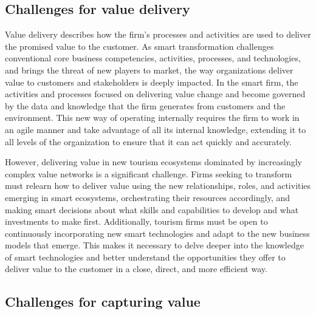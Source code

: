 \documentclass[
  letterpaper,
  DIV=11,
  numbers=noendperiod]{scrreprt}
\begin{document}
\hypertarget{challenges-for-value-delivery}{%
\subsection{Challenges for value
delivery}\label{challenges-for-value-delivery}}

Value delivery describes how the firm's processes and activities are
used to deliver the promised value to the customer. As smart
transformation challenges conventional core business competencies,
activities, processes, and technologies, and brings the threat of new
players to market, the way organizations deliver value to customers and
stakeholders is deeply impacted. In the smart firm, the activities and
processes focused on delivering value change and become governed by the
data and knowledge that the firm generates from customers and the
environment. This new way of operating internally requires the firm to
work in an agile manner and take advantage of all its internal
knowledge, extending it to all levels of the organization to ensure that
it can act quickly and accurately.

However, delivering value in new tourism ecosystems dominated by
increasingly complex value networks is a significant challenge. Firms
seeking to transform must relearn how to deliver value using the new
relationships, roles, and activities emerging in smart ecosystems,
orchestrating their resources accordingly, and making smart decisions
about what skills and capabilities to develop and what investments to
make first. Additionally, tourism firms must be open to continuously
incorporating new smart technologies and adapt to the new business
models that emerge. This makes it necessary to delve deeper into the
knowledge of smart technologies and better understand the opportunities
they offer to deliver value to the customer in a close, direct, and more
efficient way.

\hypertarget{challenges-for-capturing-value}{%
\subsection{Challenges for capturing
value}\label{challenges-for-capturing-value}}
\end{document}
